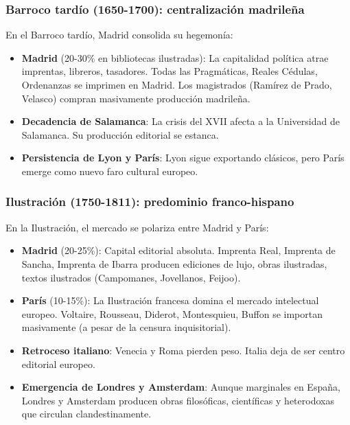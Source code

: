 \documentclass[11pt,a4paper]{article}
\begin{document}
\subsubsection{Barroco tardío (1650-1700): centralización madrileña}

En el Barroco tardío, Madrid consolida su hegemonía:

\begin{itemize}
\item \textbf{Madrid} (20-30\% en bibliotecas ilustradas): La capitalidad política atrae imprentas, libreros, tasadores. Todas las Pragmáticas, Reales Cédulas, Ordenanzas se imprimen en Madrid. Los magistrados (Ramírez de Prado, Velasco) compran masivamente producción madrileña.

\item \textbf{Decadencia de Salamanca}: La crisis del XVII afecta a la Universidad de Salamanca. Su producción editorial se estanca.

\item \textbf{Persistencia de Lyon y París}: Lyon sigue exportando clásicos, pero París emerge como nuevo faro cultural europeo.
\end{itemize}

\subsubsection{Ilustración (1750-1811): predominio franco-hispano}

En la Ilustración, el mercado se polariza entre Madrid y París:

\begin{itemize}
\item \textbf{Madrid} (20-25\%): Capital editorial absoluta. Imprenta Real, Imprenta de Sancha, Imprenta de Ibarra producen ediciones de lujo, obras ilustradas, textos ilustrados (Campomanes, Jovellanos, Feijoo).

\item \textbf{París} (10-15\%): La Ilustración francesa domina el mercado intelectual europeo. Voltaire, Rousseau, Diderot, Montesquieu, Buffon se importan masivamente (a pesar de la censura inquisitorial).

\item \textbf{Retroceso italiano}: Venecia y Roma pierden peso. Italia deja de ser centro editorial europeo.

\item \textbf{Emergencia de Londres y Amsterdam}: Aunque marginales en España, Londres y Amsterdam producen obras filosóficas, científicas y heterodoxas que circulan clandestinamente.
\end{itemize}
\end{document}
